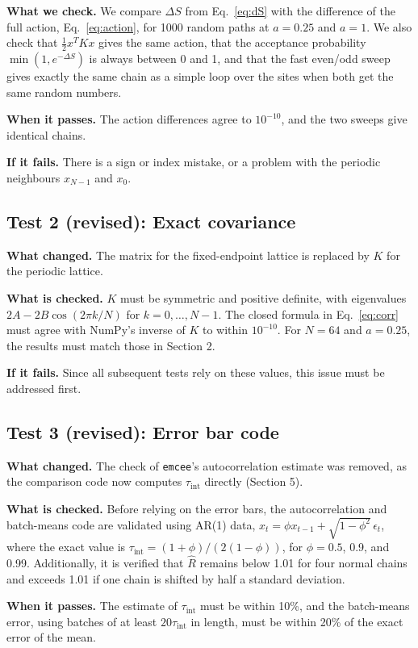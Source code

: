 \documentclass[11pt]{article}
\begin{document}
\textbf{What we check.} We compare $\Delta S$ from Eq.~\eqref{eq:dS} with the difference of the full action, Eq.~\eqref{eq:action}, for 1000 random paths at $a = 0.25$ and $a = 1$. We also check that $\frac12 x^T K x$ gives the same action, that the acceptance probability $\min(1, e^{-\Delta S})$ is always between 0 and 1, and that the fast even/odd sweep gives exactly the same chain as a simple loop over the sites when both get the same random numbers.

\textbf{When it passes.} The action differences agree to $10^{-10}$, and the two sweeps give identical chains.

\textbf{If it fails.} There is a sign or index mistake, or a problem with the periodic neighbours $x_{N-1}$ and $x_0$.

\subsection*{Test 2 (revised): Exact covariance}
\textbf{What changed.} The matrix for the fixed-endpoint lattice is replaced by $K$ for the periodic lattice.

\textbf{What is checked.} $K$ must be symmetric and positive definite, with eigenvalues $2A - 2B\cos(2\pi k/N)$ for $k = 0, \dots, N-1$. The closed formula in Eq.~\eqref{eq:corr} must agree with NumPy's inverse of $K$ to within $10^{-10}$. For $N = 64$ and $a = 0.25$, the results must match those in Section 2.

\textbf{If it fails.} Since all subsequent tests rely on these values, this issue must be addressed first.

\subsection*{Test 3 (revised): Error bar code}
\textbf{What changed.} The check of \texttt{emcee}'s autocorrelation estimate was removed, as the comparison code now computes $\tau_{\text{int}}$ directly (Section 5).

\textbf{What is checked.} Before relying on the error bars, the autocorrelation and batch-means code are validated using AR(1) data, $x_t = \phi x_{t-1} + \sqrt{1-\phi^2}\,\epsilon_t$, where the exact value is $\tau_{\text{int}} = (1+\phi)/(2(1-\phi))$, for $\phi = 0.5$, 0.9, and 0.99. Additionally, it is verified that $\hat R$ remains below 1.01 for four normal chains and exceeds 1.01 if one chain is shifted by half a standard deviation.

\textbf{When it passes.} The estimate of $\tau_{\text{int}}$ must be within 10\%, and the batch-means error, using batches of at least $20\tau_{\text{int}}$ in length, must be within 20\% of the exact error of the mean.
\end{document}
